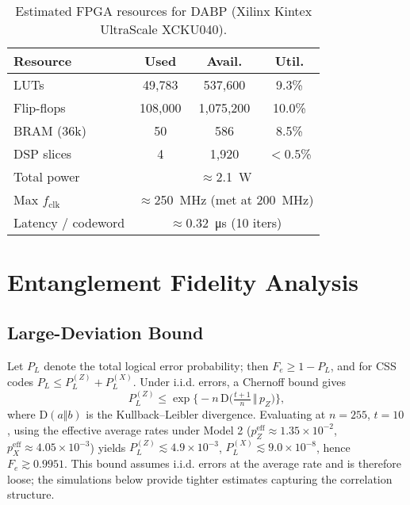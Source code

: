 \documentclass[conference]{IEEEtran}
\newcommand{\KL}{\mathrm{D}}
\begin{document}
\begin{table}[t]
\centering
\caption{Estimated FPGA resources for DABP (Xilinx Kintex UltraScale XCKU040).}
\label{tab:resources}
\begin{tabular}{lccc}
\toprule
\textbf{Resource} & \textbf{Used} & \textbf{Avail.} & \textbf{Util.} \\
\midrule
LUTs & 49{,}783 & 537{,}600 & 9.3\% \\
Flip-flops & 108{,}000 & 1{,}075{,}200 & 10.0\% \\
BRAM (36k) & 50 & 586 & 8.5\% \\
DSP slices & 4 & 1{,}920 & $<0.5$\% \\
\midrule
Total power & \multicolumn{3}{c}{\(\approx\)\SI{2.1}{\watt}} \\
Max \(f_\mathrm{clk}\) & \multicolumn{3}{c}{\(\approx\)\SI{250}{\mega\hertz} (met at \SI{200}{\mega\hertz})} \\
Latency / codeword & \multicolumn{3}{c}{\(\approx\)\SI{0.32}{\micro\second} (10 iters)} \\
\bottomrule
\end{tabular}
\end{table}

\section{Entanglement Fidelity Analysis}\label{sec:analysis}

\subsection{Large-Deviation Bound}\label{sec:fidelity_bound}
Let \(P_L\) denote the total logical error probability; then \(F_e \ge 1-P_L\), and for CSS codes \(P_L \le P_L^{(Z)}+P_L^{(X)}\). Under i.i.d. errors, a Chernoff bound gives
\begin{equation}
P_L^{(Z)} \le \exp\!\Big\{-n\, \KL\!\Big(\tfrac{t+1}{n}\,\Big\Vert\, p_Z\Big)\Big\},\label{eq:ldp}
\end{equation}
where \(\KL(a\Vert b)\) is the Kullback--Leibler divergence.
Evaluating at \(n=255\), \(t=10\), using the effective average rates under Model 2 (\(p_Z^{\mathrm{eff}}\approx1.35\times10^{-2}\), \(p_X^{\mathrm{eff}}\approx4.05\times10^{-3}\)) yields
\(P_L^{(Z)} \lesssim 4.9\times10^{-3}\), \(P_L^{(X)} \lesssim 9.0\times10^{-8}\), hence \(F_e \gtrsim 0.9951\).
This bound assumes i.i.d. errors at the average rate and is therefore loose; the simulations below provide tighter estimates capturing the correlation structure.
\end{document}
